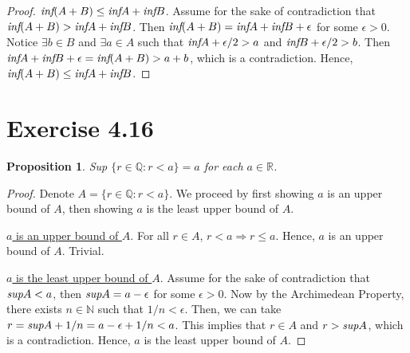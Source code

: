 \documentclass{article}
\newtheorem{proposition}[thm]{Proposition}
\begin{document}
\begin{enumerate}[label=(\alph*)]
\begin{proof}
        \underline{$\emph{inf}(A+B)\le\emph{inf}A+\emph{inf}B$}. Assume for the sake of 
        contradiction that $\emph{inf}(A+B)>\emph{inf}A+\emph{inf}B$. Then $\emph{inf}(A+B) = 
        \emph{inf}A+\emph{inf}B+\epsilon$ for some $\epsilon > 0$. Notice $\exists b\in B$ and 
        $\exists a\in A$ such that $\emph{inf}A + \epsilon/2 > a$ and $\emph{inf}B + \epsilon/2 > 
        b$. Then $\emph{inf}A + \emph{inf}B + \epsilon =\emph{inf}(A+B)> a + b$, which is a 
        contradiction. Hence, $\emph{inf}(A+B)\le\emph{inf}A+\emph{inf}B$.
    \end{proof}
\end{enumerate}

\section*{Exercise 4.16}
\begin{proposition}
    Sup $\{r\in\mathbb{Q}:r<a\} = a$ for each $a\in\mathbb{R}$.
\end{proposition}
\begin{proof}
    Denote $A = \{r\in\mathbb{Q}:r<a\}$. We proceed by first showing $a$ is an upper bound of $A$, 
    then showing $a$ is the least upper bound of $A$.

    \underline{$a$ is an upper bound of $A$}. For all $r\in A$, $r < a \Rightarrow r\le a$. Hence, 
    $a$ is an upper bound of $A$. Trivial.

    \underline{$a$ is the least upper bound of $A$}. Assume for the sake of contradiction that 
    $\emph{sup}A < a$, then $\emph{sup}A = a - \epsilon$ for some $\epsilon > 0$. Now by the 
    Archimedean Property, there exists $n\in\mathbb{N}$ such that $1/n < \epsilon$. Then, we can 
    take $r = \emph{sup}A + 1/n = a - \epsilon + 1/n < a$. This implies that $r\in A$ and $r > 
    \emph{sup}A$, which is a contradiction. Hence, $a$ is the least upper bound of $A$.
\end{proof}
\end{document}
